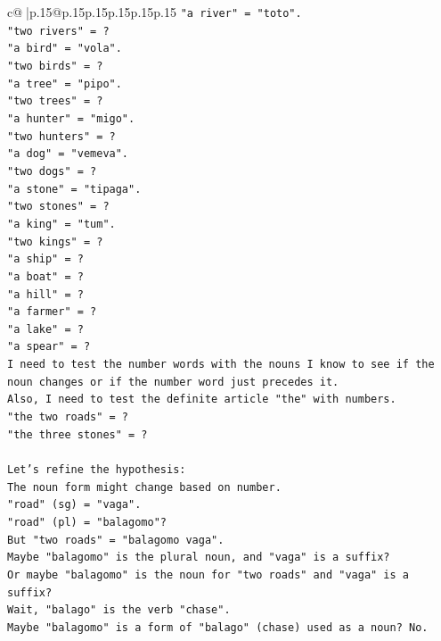\documentclass{article}
\begin{document}
{\begin{supertabular}{c@{$\;$}|p{.15\linewidth}@{}p{.15\linewidth}p{.15\linewidth}p{.15\linewidth}p{.15\linewidth}p{.15\linewidth}}
{{{\texttt{"a river" = "toto".} \\
\texttt{"two rivers" = ?} \\
\texttt{"a bird" = "vola".} \\
\texttt{"two birds" = ?} \\
\texttt{"a tree" = "pipo".} \\
\texttt{"two trees" = ?} \\
\texttt{"a hunter" = "migo".} \\
\texttt{"two hunters" = ?} \\
\texttt{"a dog" = "vemeva".} \\
\texttt{"two dogs" = ?} \\
\texttt{"a stone" = "tipaga".} \\
\texttt{"two stones" = ?} \\
\texttt{"a king" = "tum".} \\
\texttt{"two kings" = ?} \\
\texttt{"a ship" = ?} \\
\texttt{"a boat" = ?} \\
\texttt{"a hill" = ?} \\
\texttt{"a farmer" = ?} \\
\texttt{"a lake" = ?} \\
\texttt{"a spear" = ?} \\
\texttt{I need to test the number words with the nouns I know to see if the noun changes or if the number word just precedes it.} \\
\texttt{Also, I need to test the definite article "the" with numbers.} \\
\texttt{"the two roads" = ?} \\
\texttt{"the three stones" = ?} \\
\\ 
\texttt{Let's refine the hypothesis:} \\
\texttt{The noun form might change based on number.} \\
\texttt{"road" (sg) = "vaga".} \\
\texttt{"road" (pl) = "balagomo"?} \\
\texttt{But "two roads" = "balagomo vaga".} \\
\texttt{Maybe "balagomo" is the plural noun, and "vaga" is a suffix?} \\
\texttt{Or maybe "balagomo" is the noun for "two roads" and "vaga" is a suffix?} \\
\texttt{Wait, "balago" is the verb "chase".} \\
\texttt{Maybe "balagomo" is a form of "balago" (chase) used as a noun? No.} \\
}}}
\end{supertabular}}
\end{document}
